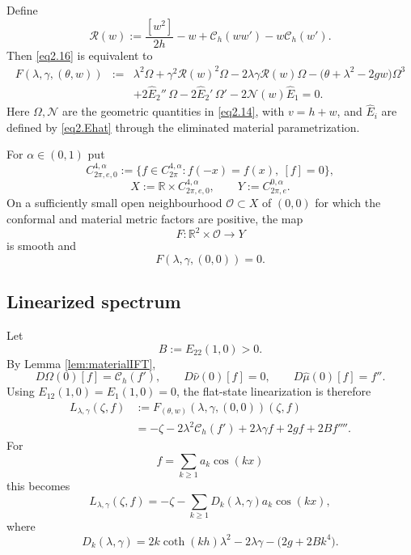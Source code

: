 \documentclass[12pt]{article}
\numberwithin{equation}{section}
\numberwithin{equation}{section}
\begin{document}
Define
\begin{equation}\label{eq3.R}
\mathscr R(w)
:=
\frac{[w^2]}{2h}-w
+\mathcal C_h(ww')-w\mathcal C_h(w').
\end{equation}
Then \eqref{eq2.16} is equivalent to
\begin{eqnarray}\label{eq3.4}
F(\lambda,\gamma,(\theta,w))
&:=&
\lambda^2\Omega
+\gamma^2\mathscr R(w)^2\Omega
-2\lambda\gamma\mathscr R(w)\Omega
-\bigl(\theta+\lambda^2-2gw\bigr)\Omega^3
\nonumber\\
&&
+2\widehat E_2''\,\Omega
-2\widehat E_2'\,\Omega'
-2\mathcal N(w)\widehat E_1
=0.
\end{eqnarray}
Here $\Omega,\mathcal N$ are the geometric quantities in \eqref{eq2.14}, with
$v=h+w$, and $\widehat E_i$ are defined by \eqref{eq2.Ehat} through the eliminated
material parametrization.

For $\alpha\in(0,1)$ put
\[
C^{4,\alpha}_{2\pi,e,0}
:=
\{f\in C^{4,\alpha}_{2\pi}:f(-x)=f(x),\ [f]=0\},
\]
\[
X:=\mathbb R\times C^{4,\alpha}_{2\pi,e,0},
\qquad
Y:=C^{0,\alpha}_{2\pi,e}.
\]
On a sufficiently small open neighbourhood $\mathcal O\subset X$ of $(0,0)$ for which
the conformal and material metric factors are positive, the map
\[
F:\mathbb R^2\times\mathcal O\to Y
\]
is smooth and
\[
F(\lambda,\gamma,(0,0))=0.
\]

\subsection{Linearized spectrum}

Let
\[
B:=E_{22}(1,0)>0.
\]
By Lemma \ref{lem:materialIFT},
\begin{equation}\label{eq3.6}
D\Omega(0)[f]=\mathcal C_h(f'),
\qquad
D\widehat\nu(0)[f]=0,
\qquad
D\widehat\mu(0)[f]=f''.
\end{equation}
Using $E_{12}(1,0)=E_1(1,0)=0$, the flat-state linearization is therefore
\begin{equation}\label{eq3.7}
\begin{aligned}
L_{\lambda,\gamma}(\zeta,f)
&:=F_{(\theta,w)}(\lambda,\gamma,(0,0))(\zeta,f)\\
&=-\zeta
-2\lambda^2\mathcal C_h(f')
+2\lambda\gamma f+2gf
+2Bf''''.
\end{aligned}
\end{equation}
For
\[
f=\sum_{k\ge1}a_k\cos(kx)
\]
this becomes
\begin{equation}\label{eq3.9}
L_{\lambda,\gamma}(\zeta,f)
=
-\zeta-\sum_{k\ge1}D_k(\lambda,\gamma)a_k\cos(kx),
\end{equation}
where
\begin{equation}\label{eq3.10}
D_k(\lambda,\gamma)
=
2k\coth(kh)\lambda^2
-2\lambda\gamma
-\bigl(2g+2Bk^4\bigr).
\end{equation}
\end{document}
